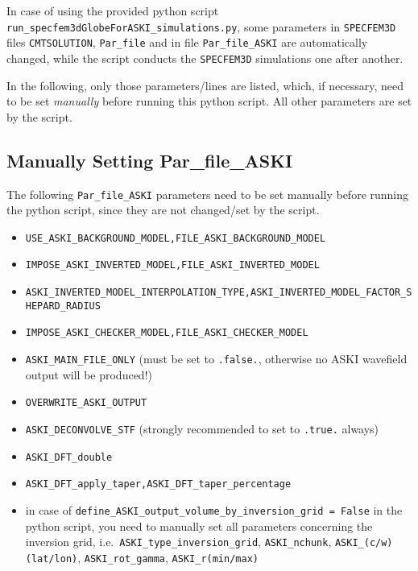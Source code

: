 \documentclass[12pt,a4paper]{article}
\newcommand{\lcode}[1]{\nolinkurl{#1}}
\newcommand{\lcodetitle}[1]{ {\ttfamily #1} }
\newcommand{\ASKI}{ {\ttfamily ASKI} }
\begin{document}
In case of using the provided python script \lcode{run_specfem3dGlobeForASKI_simulations.py},
some parameters in \lcode{SPECFEM3D} files \lcode{CMTSOLUTION}, \lcode{Par_file} 
and in file \lcode{Par_file_ASKI} are automatically changed, while the script conducts the
\lcode{SPECFEM3D} simulations one after another.

In the following, only those parameters/lines are listed, which, if necessary, need to be set 
\emph{manually} before running this python script. All other parameters are set by the script.

\subsection{Manually Setting \lcodetitle{Par\_file\_ASKI}}
The following \lcode{Par_file_ASKI} parameters need to be set manually before running the python script, 
since they are not changed/set by the script.
\begin{itemize}
\item \lcode{USE_ASKI_BACKGROUND_MODEL,FILE_ASKI_BACKGROUND_MODEL}
\item \lcode{IMPOSE_ASKI_INVERTED_MODEL,FILE_ASKI_INVERTED_MODEL}
\item \lcode{ASKI_INVERTED_MODEL_INTERPOLATION_TYPE,ASKI_INVERTED_MODEL_FACTOR_SHEPARD_RADIUS}
\item \lcode{IMPOSE_ASKI_CHECKER_MODEL,FILE_ASKI_CHECKER_MODEL}
\item \lcode{ASKI_MAIN_FILE_ONLY} (must be set to \lcode{.false.}, otherwise no \ASKI wavefield output will be produced!)
\item \lcode{OVERWRITE_ASKI_OUTPUT}
\item \lcode{ASKI_DECONVOLVE_STF} (strongly recommended to set to \lcode{.true.} always)
\item \lcode{ASKI_DFT_double}
\item \lcode{ASKI_DFT_apply_taper,ASKI_DFT_taper_percentage}
\item in case of \lcode{define_ASKI_output_volume_by_inversion_grid = False} in the python script, 
  you need to manually set all parameters concerning the inversion grid, i.e.\ \lcode{ASKI_type_inversion_grid}, 
  \lcode{ASKI_nchunk}, \lcode{ASKI_(c/w)(lat/lon)}, \lcode{ASKI_rot_gamma}, \lcode{ASKI_r(min/max)}
\end{itemize}
\end{document}
